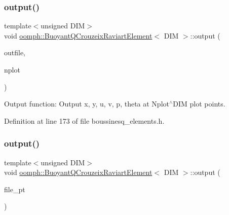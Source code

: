 \mbox{\label{classoomph_1_1BuoyantQCrouzeixRaviartElement_a855783400ac22a61e151d1611ad8e47e}} 
\subsubsection{\texorpdfstring{output()}{output()}\hspace{0.1cm}{\footnotesize\ttfamily [2/4]}}
{\footnotesize\ttfamily template$<$unsigned D\+IM$>$ \\
void \hyperlink{classoomph_1_1BuoyantQCrouzeixRaviartElement}{oomph\+::\+Buoyant\+Q\+Crouzeix\+Raviart\+Element}$<$ D\+IM $>$\+::output (\begin{DoxyParamCaption}\item[{std\+::ostream \&}]{outfile,  }\item[{const unsigned \&}]{nplot }\end{DoxyParamCaption})\hspace{0.3cm}{\ttfamily [inline]}}



Output function\+: Output x, y, u, v, p, theta at Nplot$^\wedge$\+D\+IM plot points. 



Definition at line 173 of file boussinesq\+\_\+elements.\+h.

\mbox{\label{classoomph_1_1BuoyantQCrouzeixRaviartElement_a9ba77409f12b80862262f6695829055b}} 
\subsubsection{\texorpdfstring{output()}{output()}\hspace{0.1cm}{\footnotesize\ttfamily [3/4]}}
{\footnotesize\ttfamily template$<$unsigned D\+IM$>$ \\
void \hyperlink{classoomph_1_1BuoyantQCrouzeixRaviartElement}{oomph\+::\+Buoyant\+Q\+Crouzeix\+Raviart\+Element}$<$ D\+IM $>$\+::output (\begin{DoxyParamCaption}\item[{F\+I\+LE $\ast$}]{file\+\_\+pt }\end{DoxyParamCaption})\hspace{0.3cm}{\ttfamily [inline]}}



